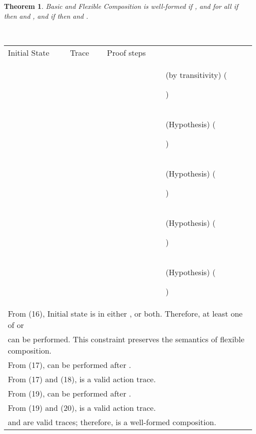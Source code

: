 \documentclass[12pt,journal,letterpaper,onecolumn]{IEEEtran}
\newcounter{myCounter}
\renewcommand{\themyCounter}{\arabic{myCounter}\addtocounter{myCounter}{1}}
\newtheorem{theorem}{Theorem}[section]
\begin{document}
\begin{theorem}
Basic and Flexible Composition  is
well-formed if , and
for all  if  then  and , and if  then
 and .\label{theorem:basicflexibleconjunction}
\end{theorem}
\\
\begin{minipage}{6in} \begin{center}
\begin{tabular}{llp{7.5cm}p{3.8cm}}
Initial State & Trace &  Proof steps & \\
 &  & & (by transitivity) \hfill(\themyCounter) \\
 &  & & (Hypothesis) \hfill(\themyCounter)\\
 & &  & (Hypothesis) \hfill(\themyCounter)\\
 &  & & (Hypothesis) \hfill(\themyCounter)\\
 & &  & (Hypothesis) \hfill(\themyCounter)\\
\multicolumn{4}{l}{From (16), Initial state  is in either
,  or both. Therefore, at least one of  or}\\
\multicolumn{4}{l}{ can be performed. This constraint preserves the semantics of flexible composition.} \\
\multicolumn{4}{l}{From (17),  can be performed after .} \\
\multicolumn{4}{l}{From (17) and (18),  is a valid action trace.} \\
\multicolumn{4}{l}{From (19),  can be performed after .} \\
\multicolumn{4}{l}{From (19) and (20),  is a valid action trace.} \\
\multicolumn{4}{l}{ and  are valid traces; therefore,
 is a well-formed composition.}
\hfill
\end{tabular}
\end{center}
\end{minipage}\\
\end{document}
